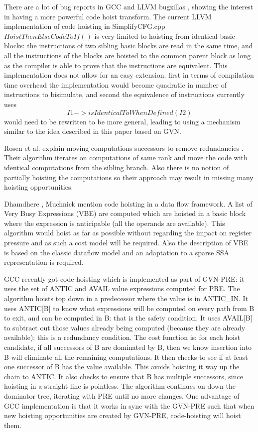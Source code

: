 \documentclass{sig-alternate}
\begin{document}
There are a lot of bug reports in GCC and LLVM bugzillas
\cite{GCCCodeHoistingBugs,LLVMCodeHoistingBugs}, showing the interest in having
a more powerful code hoist transform.  The current LLVM implementation of code
hoisting in SimplifyCFG.cpp $HoistThenElseCodeToIf()$ is very limited to
hoisting from identical basic blocks: the instructions of two sibling basic
blocks are read in the same time, and all the instructions of the blocks are
hoisted to the common parent block as long as the compiler is able to prove that
the instructions are equivalent.  This implementation does not allow for an easy
extension: first in terms of compilation time overhead the implementation would
become quadratic in number of instructions to bisimulate, and second the
equivalence of instructions currently uses $$I1->isIdenticalToWhenDefined(I2)$$
would need to be rewritten to be more general, leading to using a mechanism
similar to the idea described in this paper based on GVN.

Rosen et al. explain moving computations successors to remove redundancies
\cite{rosen1988global}. Their algorithm iterates on computations of same rank
and move the code with identical computations from the sibling branch. Also
there is no notion of partially hoisting the computations so their approach may
result in missing many hoisting opportunities.

Dhamdhere \cite{dhamdhere1988fast}, Muchnick \cite{steven1997advanced} mention
code hoisting in a data flow framework. A list of Very Busy Expressions (VBE)
are computed which are hoisted in a basic block where the expression is
anticipable (all the operands are available). This algorithm would hoist as far
as possible without regarding the impact on register pressure and as such a cost
model will be required.  Also the description of VBE is based on the classic
dataflow model and an adaptation to a sparse SSA representation is required.

GCC recently got code-hoisting which is implemented as part of GVN-PRE: it uses
the set of ANTIC and AVAIL value expressions computed for PRE.  The algorithm
hoists top down in a predecessor where the value is in ANTIC\_IN.  It uses
ANTIC[B] to know what expressions will be computed on every path from B to exit,
and can be computed in B: that is the safety condition.  It uses AVAIL[B] to
subtract out those values already being computed (because they are already
available): this is a redundancy condition.  The cost function is: for each
hoist candidate, if all successors of B are dominated by B, then we know
insertion into B will eliminate all the remaining computations.  It then checks
to see if at least one successor of B has the value available.  This avoids
hoisting it way up the chain to ANTIC.  It also checks to ensure that B has
multiple successors, since hoisting in a straight line is pointless.  The
algorithm continues on down the dominator tree, iterating with PRE until no more
changes.  One advantage of GCC implementation is that it works in sync with the
GVN-PRE such that when new hoisting opportunities are created by GVN-PRE,
code-hoisting will hoist them.
\end{document}
